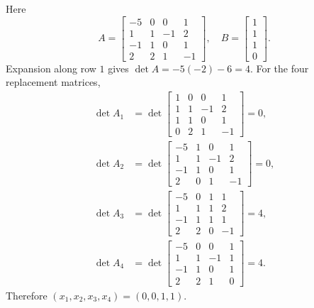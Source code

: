 \begin{enumerate}[label=\alph*)]
\begin{answer}
Here
\[
 A=\begin{bmatrix}-5&0&0&1\\1&1&-1&2\\-1&1&0&1\\2&2&1&-1\end{bmatrix},\quad
 B=\begin{bmatrix}1\\1\\1\\0\end{bmatrix}.
\]
Expansion along row $1$ gives $\det A=-5(-2)-6=4$.
For the four replacement matrices,
\[
\begin{aligned}
 \det A_1&=\det\begin{bmatrix}1&0&0&1\\1&1&-1&2\\1&1&0&1\\0&2&1&-1\end{bmatrix}=0,\\
 \det A_2&=\det\begin{bmatrix}-5&1&0&1\\1&1&-1&2\\-1&1&0&1\\2&0&1&-1\end{bmatrix}=0,\\
 \det A_3&=\det\begin{bmatrix}-5&0&1&1\\1&1&1&2\\-1&1&1&1\\2&2&0&-1\end{bmatrix}=4,\\
 \det A_4&=\det\begin{bmatrix}-5&0&0&1\\1&1&-1&1\\-1&1&0&1\\2&2&1&0\end{bmatrix}=4.
\end{aligned}
\]
Therefore $(x_1,x_2,x_3,x_4)=(0,0,1,1)$.
\end{answer}
\end{enumerate}
